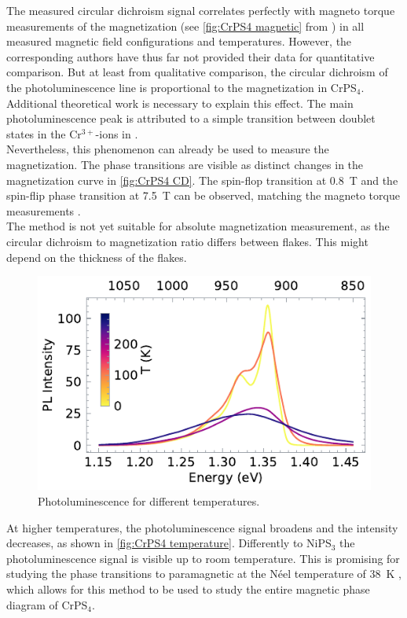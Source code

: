 \documentclass[
	twoside,
	parskip=half,
	a4paper,
]{scrbook}
\begin{document}
The measured circular dichroism signal correlates perfectly with magneto torque measurements of the magnetization (see \autoref{fig:CrPS4 magnetic} from \cite{CrPS4_magnetic}) in all measured magnetic field configurations and temperatures.
However, the corresponding authors have thus far not provided their data for quantitative comparison.
But at least from qualitative comparison, the circular dichroism of the photoluminescence line is proportional to the magnetization in CrPS$_4$.\\
Additional theoretical work is necessary to explain this effect.
The main photoluminescence peak is attributed to a simple transition between doublet states in the Cr$^{3+}$-ions in \cite{CrPS4_pl}.\todo{}\\
Nevertheless, this phenomenon can already be used to measure the magnetization.
The phase transitions are visible as distinct changes in the magnetization curve in \autoref{fig:CrPS4 CD}.
The spin-flop transition at \SI{.8}{T} and the spin-flip phase transition at \SI{7.5}{T} can be observed, matching the magneto torque measurements \cite{CrPS4_magnetic}.\\
The method is not yet suitable for absolute magnetization measurement, as the circular dichroism to magnetization ratio differs between flakes.
This might depend on the thickness of the flakes.


\begin{figure}
	\centering
	\includegraphics{../figures/2024-04-22 CrPS4 temperature series.pdf}
	\caption{Photoluminescence for different temperatures.}
	\label{fig:CrPS4 temperature}
\end{figure}
At higher temperatures, the photoluminescence signal broadens and the intensity decreases, as shown in \autoref{fig:CrPS4 temperature}.
Differently to NiPS$_3$ the photoluminescence signal is visible up to room temperature.
This is promising for studying the phase transitions to paramagnetic at the Néel temperature of \SI{38}{K} \cite{CrPS4_magnetic},
which allows for this method to be used to study the entire magnetic phase diagram of CrPS$_4$.
\end{document}
